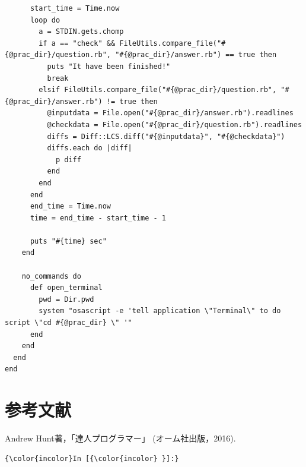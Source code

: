 \documentclass[11pt,dvipdfmx]{jsarticle}
\begin{document}
\begin{verbatim}
      start_time = Time.now
      loop do
        a = STDIN.gets.chomp
        if a == "check" && FileUtils.compare_file("#{@prac_dir}/question.rb", "#{@prac_dir}/answer.rb") == true then
          puts "It have been finished!"
          break
        elsif FileUtils.compare_file("#{@prac_dir}/question.rb", "#{@prac_dir}/answer.rb") != true then
          @inputdata = File.open("#{@prac_dir}/answer.rb").readlines
          @checkdata = File.open("#{@prac_dir}/question.rb").readlines
          diffs = Diff::LCS.diff("#{@inputdata}", "#{@checkdata}")
          diffs.each do |diff|
            p diff
          end
        end
      end
      end_time = Time.now
      time = end_time - start_time - 1
      
      puts "#{time} sec"
    end
    
    no_commands do
      def open_terminal
        pwd = Dir.pwd
        system "osascript -e 'tell application \"Terminal\" to do script \"cd #{@prac_dir} \" '"
      end
    end
  end
end
\end{verbatim}

    \section{参考文献}\label{ux53c2ux8003ux6587ux732e}

    Andrew Hunt著，「達人プログラマー」 (オーム社出版，2016).

    \begin{Verbatim}[commandchars=\\\{\}]
{\color{incolor}In [{\color{incolor} }]:} 
\end{Verbatim}


    
    
    
    
\end{document}
